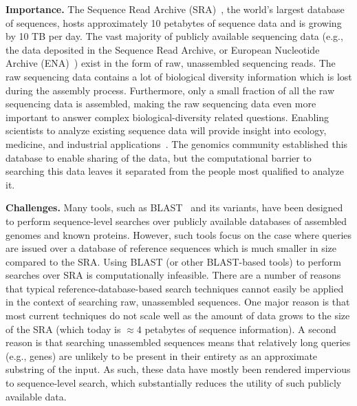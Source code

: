 \noindent
\textbf{Importance.}
The Sequence Read Archive (SRA)~\cite{kodama2012sequence}, the world’s largest database of sequences, hosts approximately 10 petabytes %
of sequence data and is growing by 
10 TB per day.
%
The vast majority of publicly available sequencing data (e.g., the data deposited in the Sequence Read Archive, or European Nucleotide Archive (ENA)~\cite{CumminsAABDEGHH22}) exist in the form of raw, unassembled sequencing reads. The raw sequencing data contains a lot of biological diversity information which is lost during the assembly process. Furthermore, only a small fraction of all the raw sequencing data is assembled, making the raw sequencing data even more important to answer complex biological-diversity related questions.
%
Enabling scientists to analyze existing sequence data will provide insight into ecology, medicine, and industrial applications~\cite{LeviRAE18}.
%
The genomics community established this database to enable sharing of the data, but the computational barrier to searching this data leaves it separated from the people most qualified to analyze it.

\noindent
\textbf{Challenges.}
Many tools, such as BLAST~\cite{altschul1990basic} and its variants, have been designed to perform sequence-level searches over publicly available databases of assembled genomes and known proteins. %
However, such tools focus on the case where queries are issued over a database of reference sequences which is much smaller in size compared to the SRA\@.
Using BLAST (or other BLAST-based tools) to perform searches over SRA is computationally infeasible.
%
There are a number of reasons that typical reference-database-based search techniques cannot easily be applied in the context of searching raw, unassembled sequences. One major reason is that most current techniques do not scale well as the amount of data grows to the size of the SRA (which today is $\approx4$ petabytes of sequence information). A second reason is that searching unassembled sequences means that relatively long queries (e.g., genes) are unlikely to be present in their entirety as an approximate substring of the input.
As such, these data have mostly been rendered impervious to sequence-level search, which substantially reduces the utility of such publicly available data.


